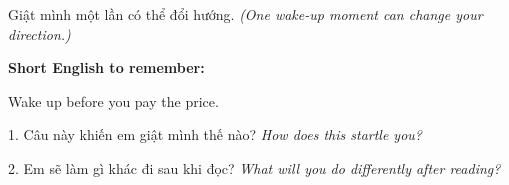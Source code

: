 \begin{baihoc}
Giật mình một lần có thể đổi hướng.
\textit{(One wake-up moment can change your direction.)}
\end{baihoc}

\begin{ghinhoanh}
\textbf{Short English to remember:}

Wake up before you pay the price.

\end{ghinhoanh}

\begin{tuhocnhanh}
1. Câu này khiến em giật mình thế nào? \textit{How does this startle you?}

2. Em sẽ làm gì khác đi sau khi đọc? \textit{What will you do differently after reading?}
\end{tuhocnhanh}
\ngancach
